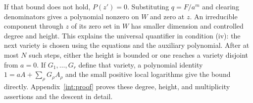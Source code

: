 If that bound does not hold, $P(z')=0$.  Substituting $q=F/a^m$ and
clearing denominators gives a polynomial nonzero on $W$ and zero at
$z$.  An irreducible component through $z$ of its zero set in $W$
has smaller dimension and controlled degree and height.  This explains
the universal quantifier in condition \textup{(iv)}: the next variety
is chosen using the equations and the auxiliary polynomial.  After at
most $N$ such steps, either the height is bounded or one reaches a
variety disjoint from $a=0$.  If $G_1,\ldots,G_r$ define that variety,
a polynomial identity $1=aA+\sum_\rho G_\rho A_\rho$ and the small
positive local logarithms give the bound directly.
Appendix~\ref{int:proof} proves these degree, height, and multiplicity
assertions and the descent in detail.
